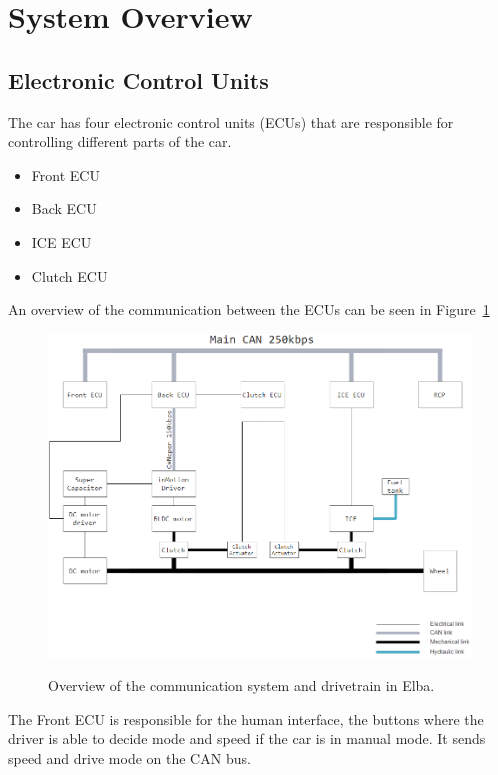 \section{System Overview}
\subsection{Electronic Control Units}
The car has four electronic control units (ECUs) that are responsible for
controlling different parts of the car.

\begin{itemize}
\item Front ECU
\item Back ECU
\item ICE ECU
\item Clutch ECU
\end{itemize}

An overview of the communication between the ECUs can be seen in Figure~\ref{fig:communication_overview}

\begin{figure}[H]
    \centering\label{fig:communication_overview}
    \includegraphics[width=1\textwidth]{./img/elba_communication_overview}
    \caption{Overview of the communication system and drivetrain in Elba.}
\end{figure}

The Front ECU is responsible for the human interface, the buttons where the
driver is able to decide mode and speed if the car is in manual mode. It sends
speed and drive mode on the CAN bus.

